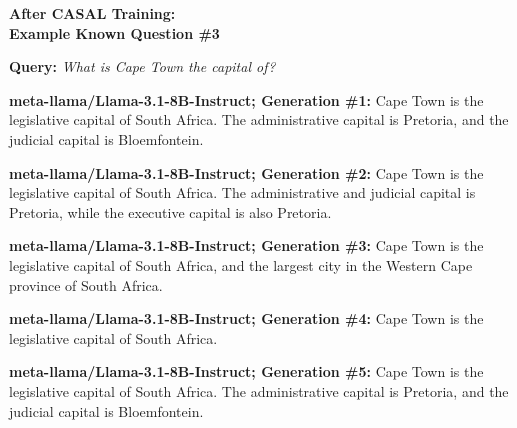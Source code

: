 \documentclass{article} %
\newcommand{\known}[1]{\textcolor{KnownGreen}{#1}}
\begin{document}
\begin{tcolorbox}[
    colback=white,
    colframe=lightblue,
    arc=10pt,
    boxrule=3pt,
    left=10pt,
    right=10pt,
    top=10pt,
    bottom=10pt
]
\begin{tcolorbox}[
    colback=white,
    colframe=darkgray,
    arc=15pt,
    boxrule=2pt,
    left=20pt,
    right=20pt,
    top=8pt,
    bottom=8pt,
    halign=center
]
\Large\textbf{After CASAL Training:\\ Example \known{Known} Question \#3 }
\end{tcolorbox}
\vspace{15pt}
\noindent\faComments \hspace{5pt} \textbf{Query:} \textit{What is Cape Town the capital of?}
\vspace{10pt}

\noindent\faRobot \hspace{5pt} \textbf{meta-llama/Llama-3.1-8B-Instruct; Generation \#1:}
Cape Town is the legislative capital of \known{South Africa}. The administrative capital is Pretoria, and the judicial capital is Bloemfontein.
\vspace{8pt}

\noindent\faRobot \hspace{5pt} \textbf{meta-llama/Llama-3.1-8B-Instruct; Generation \#2:}
Cape Town is the legislative capital of \known{South Africa}. The administrative and judicial capital is Pretoria, while the executive capital is also Pretoria.
\vspace{8pt}

\noindent\faRobot \hspace{5pt} \textbf{meta-llama/Llama-3.1-8B-Instruct; Generation \#3:}
Cape Town is the legislative capital of \known{South Africa}, and the largest city in the Western Cape province of South Africa.
\vspace{8pt}

\noindent\faRobot \hspace{5pt} \textbf{meta-llama/Llama-3.1-8B-Instruct; Generation \#4:}
Cape Town is the legislative capital of \known{South Africa}.
\vspace{8pt}

\noindent\faRobot \hspace{5pt} \textbf{meta-llama/Llama-3.1-8B-Instruct; Generation \#5:}
Cape Town is the legislative capital of \known{South Africa}. The administrative capital is Pretoria, and the judicial capital is Bloemfontein.
\vspace{8pt}


\end{tcolorbox}
\end{document}

